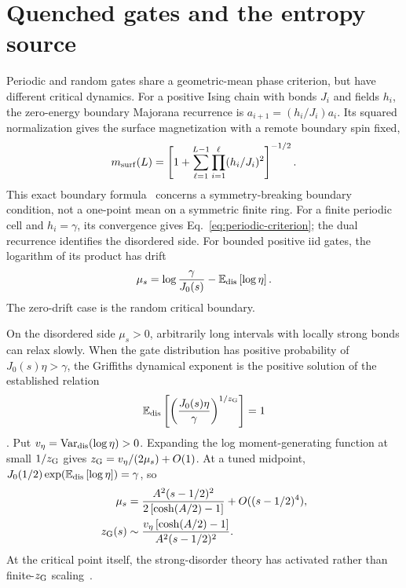 \documentclass[aps,pre,reprint,amsmath,amssymb,longbibliography,floatfix]{revtex4-2}
\newcommand{\E}{\mathbb E}
\newcommand{\Var}{\operatorname{Var}}
\begin{document}
\section{Quenched gates and the entropy source}
\label{app:random-gates}
Periodic and random gates share a geometric-mean phase criterion, but
have different critical dynamics. For a positive Ising chain with bonds
$J_i$ and fields $h_i$, the zero-energy boundary Majorana recurrence is
$a_{i+1}=(h_i/J_i)a_i$. Its squared normalization gives the surface
magnetization with a remote boundary spin fixed,
\begin{equation}
 m_{\rm surf}(L)=\left[1+\sum_{\ell=1}^{L-1}
 \prod_{i=1}^{\ell}(h_i/J_i)^2\right]^{-1/2}.
 \label{eq:surface-product}
\end{equation}
This exact boundary formula~\cite{IgloiRieger1998RandomWalks} concerns
a symmetry-breaking boundary condition, not a one-point mean on a
symmetric finite ring. For a finite periodic cell and $h_i=\gamma$,
its convergence gives Eq.~\eqref{eq:periodic-criterion}; the dual
recurrence identifies the disordered side. For bounded positive iid
gates, the logarithm of its product has drift
\begin{equation}
 \mu_s=\log\frac{\gamma}{J_0(s)}-\E_{\rm dis}\left[\log\eta\right].
 \label{eq:random-drift}
\end{equation}
The zero-drift case is the random critical boundary.

On the disordered side $\mu_s>0$, arbitrarily long intervals with
locally strong bonds can relax slowly. When the gate distribution has
positive probability of $J_0(s)\eta>\gamma$, the Griffiths dynamical
exponent is the positive solution of the established relation
\begin{equation}
 \E_{\rm dis}\left[\left(\frac{J_0(s)\eta}{\gamma}\right)^{1/z_{\rm G}}\right]=1
 \label{eq:Griffiths-exponent}
\end{equation}
\cite{IgloiJuhaszRieger1999Griffiths}.
Put $v_\eta=\Var_{\rm dis}(\log\eta)>0$. Expanding the log moment-generating
function at small $1/z_{\rm G}$ gives
$z_{\rm G}=v_\eta/(2\mu_s)+O(1)$. At a tuned midpoint,
$J_0(1/2)\exp(\E_{\rm dis}\left[\log\eta\right])=\gamma$, so
\begin{align}
 \mu_s&=\frac{A^2(s-1/2)^2}{2\left[\cosh(A/2)-1\right]}
       +O((s-1/2)^4),\nonumber\\
 z_{\rm G}(s)&\sim
 \frac{v_\eta\left[\cosh(A/2)-1\right]}{A^2(s-1/2)^2}.
 \label{eq:entropy-Griffiths}
\end{align}
At the critical point itself, the strong-disorder theory has activated
rather than finite-$z_{\rm G}$ scaling~\cite{Fisher1995}.
\end{document}
